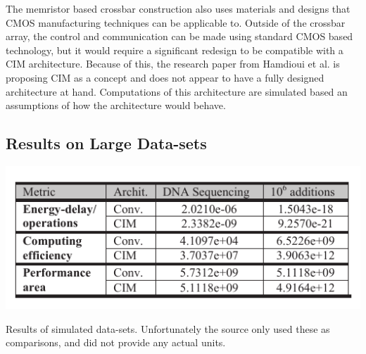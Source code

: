 \documentclass{sig-alternate}
\begin{document}
The memristor based crossbar construction also uses materials and designs that CMOS manufacturing techniques can be applicable to.  Outside of the crossbar array, the control and communication can be made using standard CMOS based technology, but it would require a significant redesign to be compatible with a CIM architecture.  Because of this, the research paper from Hamdioui et al. is proposing CIM as a concept and does not appear to have a fully designed architecture at hand.  Computations of this architecture are simulated based an assumptions of how the architecture would behave.








\subsection{Results on Large Data-sets}
\label{sec:theoremLikeConstructs}

\begin{table}
  \includegraphics[width=\linewidth]{results.pdf}
  \caption{Results of simulated data-sets.  Unfortunately the source only used these as comparisons, and did not provide any actual units. }
  \label{tab:results}
\end{table}
\end{document}
